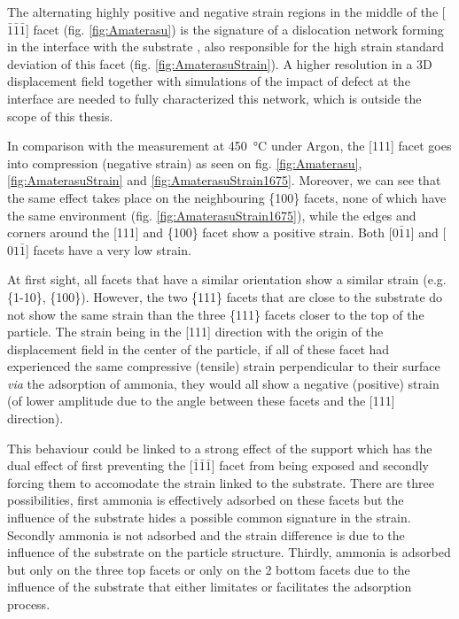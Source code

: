 The alternating highly positive and negative strain regions in the middle of the [$\bar{1}\bar{1}\bar{1}$] facet (fig. \ref{fig:Amaterasu}) is the signature of a dislocation network forming in the interface with the substrate \parencite{Dupraz2015}, also responsible for the high strain standard deviation of this facet (fig. \ref{fig:AmaterasuStrain}).
A higher resolution in a 3D displacement field together with simulations of the impact of defect at the interface are needed to fully characterized this network, which is outside the scope of this thesis.


In comparison with the measurement at \qty{450}{\degreeCelsius} under Argon, the [111] facet goes into compression (negative strain) as seen on fig. \ref{fig:Amaterasu}, \ref{fig:AmaterasuStrain} and \ref{fig:AmaterasuStrain1675}.
Moreover, we can see that the same effect takes place on the neighbouring \{100\} facets, none of which have the same environment (fig. \ref{fig:AmaterasuStrain1675}), while the edges and corners around the [111] and \{100\} facet show a positive strain.
Both [$0\bar{1}1$] and [$01\bar{1}$] facets have a very low strain.

At first sight, all facets that have a similar orientation show a similar strain (e.g. \{1-10\}, \{100\}).
However, the two \{111\} facets that are close to the substrate do not show the same strain than the three \{111\} facets closer to the top of the particle.
The strain being in the [111] direction with the origin of the displacement field in the center of the particle, if all of these facet had experienced the same compressive (tensile) strain perpendicular to their surface \textit{via} the adsorption of ammonia, they would all show a negative (positive) strain (of lower amplitude due to the angle between these facets and the [111] direction).

This behaviour could be linked to a strong effect of the support which has the dual effect of first preventing the [$\bar{1}\bar{1}\bar{1}$] facet from being exposed and secondly forcing them to accomodate the strain linked to the substrate.
There are three possibilities, first ammonia is effectively adsorbed on these facets but the influence of the substrate hides a possible common signature in the strain.
Secondly ammonia is not adsorbed and the strain difference is due to the influence of the substrate on the particle structure.
Thirdly, ammonia is adsorbed but only on the three top facets or only on the 2 bottom facets due to the influence of the substrate that either limitates or facilitates the adsorption process.

